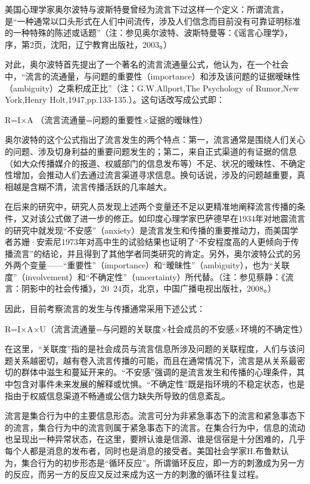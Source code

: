 \documentclass[UTF8,12pt]{ctexart}
\numberwithin{equation}{section} %
\numberwithin{figure}{section}
\numberwithin{table}{section}
\begin{document}
	美国心理学家奥尔波特与波斯特曼曾经为流言下过这样一个定义：所谓流言，是“一种通常以口头形式在人们中间流传，涉及人们信念而目前没有可靠证明标准的一种特殊的陈述或话题”（注：参见奥尔波特、波斯特曼等：《谣言心理学》，序，第2页，沈阳，辽宁教育出版社，2003。）
	
	对此，奥尔波特首先提出了一个著名的流言流通量公式，他认为，在一个社会中，“流言的流通量，与问题的重要性（importance）和涉及该问题的证据暧昧性（ambiguity）之乘积成正比”（注：G.W.Allport,The Psychology of Rumor,New York,Henry Holt,1947,pp.133-135.）。这句话改写成公式即：
	
	R=I×A （流言流通量=问题的重要性×证据的暧昧性）
	
	奥尔波特的这个公式指出了流言发生的两个特点：第一，流言通常是围绕人们关心的问题、涉及切身利益的重要问题发生的；第二，来自正式渠道的有证据的信息（如大众传播媒介的报道、权威部门的信息发布等）不足、状况的暧昧性、不确定性增加，会推动人们去通过流言渠道寻求信息。换句话说，涉及的问题越重要，真相越是含糊不清，流言传播活跃的几率越大。
	
	在后来的研究中，研究人员发现上述两个变量还不足以更精准地阐释流言传播的条件，又对该公式做了进一步的修正。如印度心理学家巴萨德早在1934年对地震流言的研究中就发现“不安感”（anxiety）是流言发生和传播的重要推动力，而美国学者苏姗·安索尼1973年对高中生的试验结果也证明了“不安程度高的人更倾向于传播流言”的结论，并且得到了其他学者同类研究的肯定。另外，奥尔波特公式的另外两个变量——“重要性”（importance）和“暧昧性”（ambiguity），也为“关联度”（involvement）和“不确定性”（uncertainty）所代替。（注：参见蔡静：《流言：阴影中的社会传播》，20~24页，北京，中国广播电视出版社，2008。）
	
	因此，目前考察流言的发生与传播通常采用下述公式：
	
	R=I×A×U（流言流通量=与问题的关联度×社会成员的不安感×环境的不确定性）
	
	在这里，“关联度”指的是社会成员与流言信息所涉及问题的关联程度，人们与该问题关系越密切，越有卷入流言传播的可能，而且在通常情况下，流言是从关系最密切的群体中滋生和蔓延开来的。“不安感”强调的是流言发生和传播的心理条件，其中包含对事件未来发展的解释或忧惧。“不确定性”既是指环境的不稳定状态，也是指由于权威信息渠道不畅通或公信力缺失所导致的信息紊乱。
	
	流言是集合行为中的主要信息形态。流言可分为非紧急事态下的流言和紧急事态下的流言，集合行为中的流言则属于紧急事态下的流言。在集合行为中，信息的流动也呈现出一种异常状态，在这里，要辨认谁是信源、谁是信宿是十分困难的，几乎每个人都是消息的发布者，同时也是消息的接受者。美国社会学家H.布鲁默认为，集合行为的初步形态是“循环反应”。所谓循环反应，即一方的刺激成为另一方的反应，而另一方的反应又反过来成为这一方的刺激的循环往复过程。
	
\end{document}
